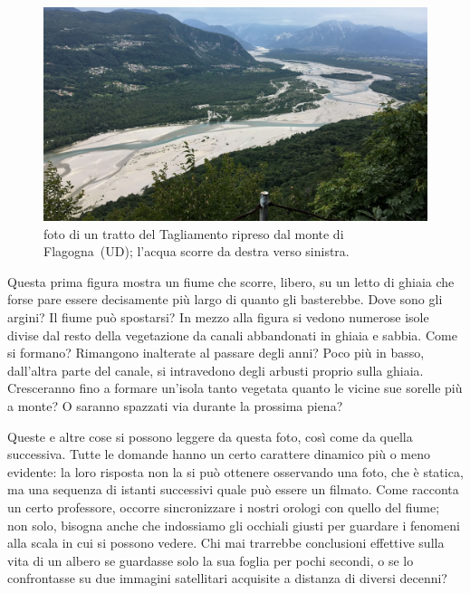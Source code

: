 

\begin{figure}[h]
	\centering
	\includegraphics[width=\textwidth]{files/foto_flagogna.jpg}
	\caption[foto di un tratto del Tagliamento ripreso dal monte di Flagogna]{foto di un tratto del Tagliamento ripreso dal monte di Flagogna~(UD); l'acqua scorre da destra verso sinistra.
	}
	\label{fig:foto-flagogna}
\end{figure}



Questa prima figura mostra un fiume che scorre, libero, su un letto di ghiaia che forse pare essere decisamente più largo di quanto gli basterebbe. 
Dove sono gli argini? Il fiume può spostarsi? 
%
In mezzo alla figura si vedono numerose isole divise dal resto della vegetazione da canali abbandonati in ghiaia e sabbia. 
Come si formano? Rimangono inalterate al passare degli anni? 
%
Poco più in basso, dall'altra parte del canale, si intravedono degli arbusti proprio sulla ghiaia. 
Cresceranno fino a formare un'isola tanto vegetata quanto le vicine sue sorelle più a monte? O saranno spazzati via durante la prossima piena?

\medskip
Queste e altre cose si possono leggere da questa foto, così come da quella successiva. Tutte le domande hanno un certo carattere dinamico più o meno evidente: la loro risposta non la si può ottenere osservando una foto, che è statica, ma una sequenza di istanti successivi quale può essere un filmato.
Come racconta un certo professore, occorre sincronizzare i nostri orologi con quello del fiume; non solo, bisogna anche che indossiamo gli occhiali giusti per guardare i fenomeni alla scala in cui si possono vedere. Chi mai trarrebbe conclusioni effettive sulla vita di un albero se guardasse solo la sua foglia per pochi secondi, o se lo confrontasse su due immagini satellitari acquisite a distanza di diversi decenni?

